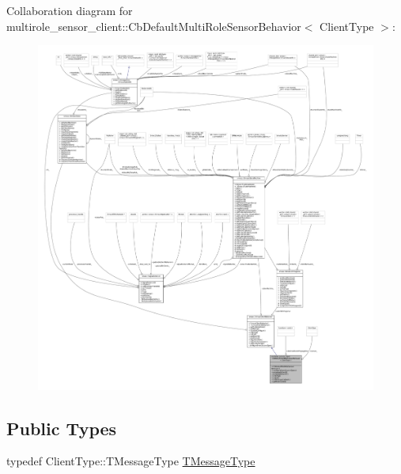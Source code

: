 Collaboration diagram for multirole\+\_\+sensor\+\_\+client\+:\+:Cb\+Default\+Multi\+Role\+Sensor\+Behavior$<$ Client\+Type $>$\+:
\nopagebreak
\begin{figure}[H]
\begin{center}
\leavevmode
\includegraphics[width=350pt]{classmultirole__sensor__client_1_1CbDefaultMultiRoleSensorBehavior__coll__graph}
\end{center}
\end{figure}
\subsection*{Public Types}
\begin{DoxyCompactItemize}
\item 
typedef Client\+Type\+::\+T\+Message\+Type \hyperlink{classmultirole__sensor__client_1_1CbDefaultMultiRoleSensorBehavior_a8343b60b6962dd8a5588d8415dd33dd9}{T\+Message\+Type}
\end{DoxyCompactItemize}
